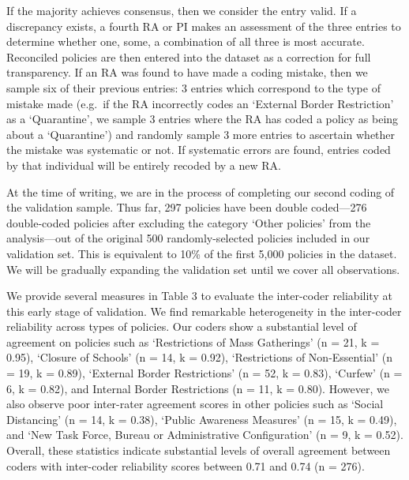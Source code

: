 \documentclass[]{article}
\begin{document}
If the majority achieves consensus, then we consider the entry valid. If a discrepancy exists, a fourth RA or PI makes an assessment of the three entries to determine whether one, some, a combination of all three is most accurate. Reconciled policies are then entered into the dataset as a correction for full transparency. If an RA was found to have made a coding mistake, then we sample six of their previous entries: 3 entries which correspond to the type of mistake made (e.g.~if the RA incorrectly codes an `External Border Restriction' as a `Quarantine', we sample 3 entries where the RA has coded a policy as being about a `Quarantine') and randomly sample 3 more entries to ascertain whether the mistake was systematic or not. If systematic errors are found, entries coded by that individual will be entirely recoded by a new RA.

At the time of writing, we are in the process of completing our second coding of the validation sample. Thus far, 297 policies have been double coded---276 double-coded policies after excluding the category `Other policies' from the analysis---out of the original 500 randomly-selected policies included in our validation set. This is equivalent to 10\% of the first 5,000 policies in the dataset. We will be gradually expanding the validation set until we cover all observations.

We provide several measures in Table 3 to evaluate the inter-coder reliability at this early stage of validation. We find remarkable heterogeneity in the inter-coder reliability across types of policies. Our coders show a substantial level of agreement on policies such as `Restrictions of Mass Gatherings' (n = 21, k = 0.95), `Closure of Schools' (n = 14, k = 0.92), `Restrictions of Non-Essential' (n = 19, k = 0.89), `External Border Restrictions' (n = 52, k = 0.83), `Curfew' (n = 6, k = 0.82), and Internal Border Restrictions (n = 11, k = 0.80). However, we also observe poor inter-rater agreement scores in other policies such as `Social Distancing' (n = 14, k = 0.38), `Public Awareness Measures' (n = 15, k = 0.49), and `New Task Force, Bureau or Administrative Configuration' (n = 9, k = 0.52). Overall, these statistics indicate substantial levels of overall agreement between coders with inter-coder reliability scores between 0.71 and 0.74 (n = 276).
\end{document}

